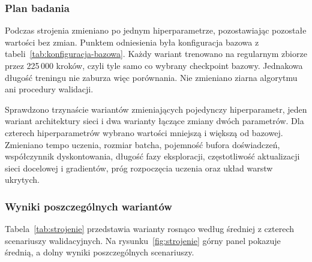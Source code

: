 \subsubsection{Plan badania}
\label{subsubsec:plan-strojenia}

Podczas strojenia zmieniano po jednym hiperparametrze, pozostawiając pozostałe wartości bez zmian. Punktem odniesienia była konfiguracja bazowa z tabeli~\ref{tab:konfiguracja-bazowa}. Każdy wariant trenowano na regularnym zbiorze przez 225\,000 kroków, czyli tyle samo co wybrany checkpoint bazowy. Jednakowa długość treningu nie zaburza więc porównania. Nie zmieniano ziarna algorytmu ani procedury walidacji.

Sprawdzono trzynaście wariantów zmieniających pojedynczy hiperparametr, jeden wariant architektury sieci i dwa warianty łączące zmiany dwóch parametrów. Dla czterech hiperparametrów wybrano wartości mniejszą i większą od bazowej. Zmieniano tempo uczenia, rozmiar batcha, pojemność bufora doświadczeń, współczynnik dyskontowania, długość fazy eksploracji, częstotliwość aktualizacji sieci docelowej i gradientów, próg rozpoczęcia uczenia oraz układ warstw ukrytych.

\subsubsection{Wyniki poszczególnych wariantów}
\label{subsubsec:wyniki-strojenia}

Tabela~\ref{tab:strojenie} przedstawia warianty rosnąco według średniej z czterech scenariuszy walidacyjnych. Na rysunku~\ref{fig:strojenie} górny panel pokazuje średnią, a dolny wyniki poszczególnych scenariuszy.

